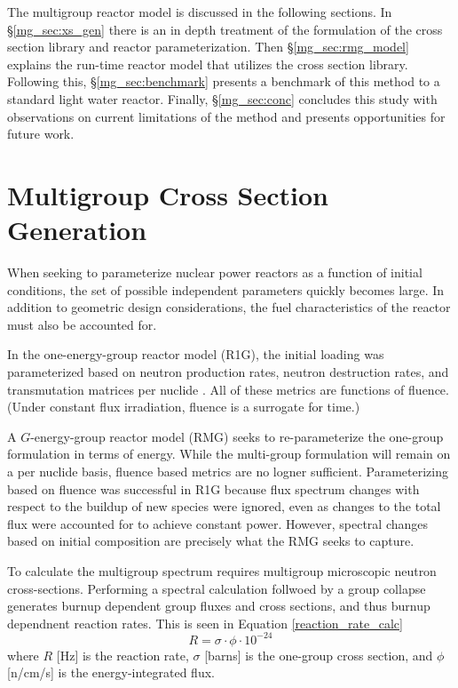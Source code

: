 The multigroup reactor model is discussed in the following sections.  In \S \ref{mg_sec:xs_gen} 
there is an in depth treatment of the formulation of the cross section library and reactor 
parameterization.  Then \S \ref{mg_sec:rmg_model} explains the run-time reactor model that 
utilizes the cross section library.  Following this, \S \ref{mg_sec:benchmark} presents a 
benchmark of this method to a standard light water reactor.  Finally, \S \ref{mg_sec:conc}
concludes this study with observations on current limitations of the method and presents 
opportunities for future work.


\section{Multigroup Cross Section Generation}
\label{mg_sec:xs_gen}
When seeking to parameterize nuclear power reactors as a function of initial conditions, 
the set of possible independent parameters quickly becomes large. In addition to geometric 
design considerations, the fuel characteristics of the reactor must also be accounted for.

In the one-energy-group reactor model (R1G), the initial loading was parameterized based
on neutron production rates, neutron destruction rates, and transmutation matrices per
nuclide \cite{Scopatz2009d}.  All of these metrics are functions of fluence.  (Under 
constant flux irradiation, fluence is a surrogate for time.)

A $G$-energy-group reactor model (RMG) seeks to re-parameterize the one-group formulation 
in terms of energy.  While the multi-group formulation will remain on a per nuclide basis, 
fluence based metrics are no logner sufficient.  Parameterizing based on fluence was successful in R1G because 
flux spectrum changes with respect to the buildup of new species were ignored, even as changes to the total 
flux were accounted for to achieve constant power.   However, 
spectral changes based on initial composition are precisely what the RMG seeks to capture.

To calculate the multigroup spectrum requires multigroup microscopic neutron cross-sections.  
Performing a spectral calculation follwoed by a group collapse generates burnup dependent 
group fluxes and cross sections, and thus burnup dependnent reaction rates.
This is seen in Equation \ref{reaction_rate_calc}
\begin{equation}
\label{reaction_rate_calc}
R = \sigma \cdot \phi \cdot 10^{-24}
\end{equation}
where $R$ [Hz] is the reaction rate, $\sigma$ [barns] is the one-group cross section, and
$\phi$ [n/cm/s] is the energy-integrated flux.

